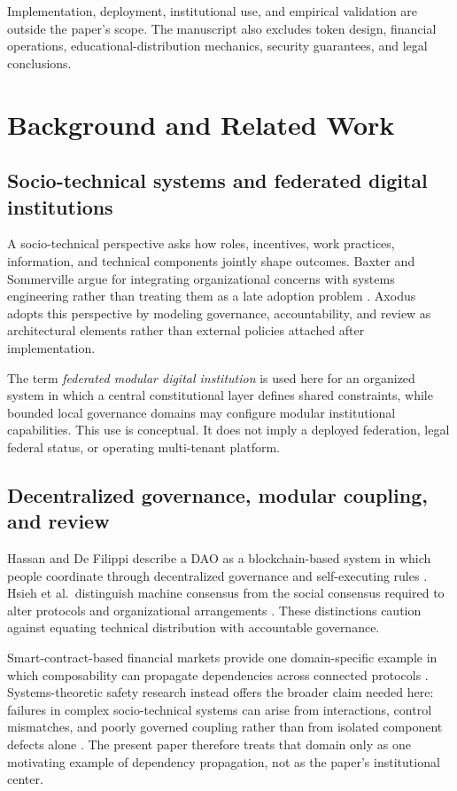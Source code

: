 \documentclass[11pt]{article}
\begin{document}
\begin{landscape}
Implementation, deployment, institutional use, and empirical validation are
outside the paper's scope. The manuscript also excludes token design,
financial operations, educational-distribution mechanics, security
guarantees, and legal conclusions.

\section{Background and Related Work}

\subsection{Socio-technical systems and federated digital institutions}

A socio-technical perspective asks how roles, incentives, work practices,
information, and technical components jointly shape outcomes. Baxter and
Sommerville argue for integrating organizational concerns with systems
engineering rather than treating them as a late adoption problem
\citep{baxter2011sociotechnical}. Axodus adopts this perspective by modeling
governance, accountability, and review as architectural elements rather than
external policies attached after implementation.

The term \emph{federated modular digital institution} is used here for an
organized system in which a central constitutional layer defines shared
constraints, while bounded local governance domains may configure modular
institutional capabilities. This use is conceptual. It does not imply a
deployed federation, legal federal status, or operating multi-tenant
platform.

\subsection{Decentralized governance, modular coupling, and review}

Hassan and De Filippi describe a DAO as a blockchain-based system in which
people coordinate through decentralized governance and self-executing rules
\citep{hassan2021dao}. Hsieh et al.\ distinguish machine consensus from the
social consensus required to alter protocols and organizational arrangements
\citep{hsieh2018bitcoin}. These distinctions caution against equating
technical distribution with accountable governance.

Smart-contract-based financial markets provide one domain-specific example in
which composability can propagate dependencies across connected protocols
\citep{schar2021defi}. Systems-theoretic safety research instead offers the
broader claim needed here: failures in complex socio-technical systems can
arise from interactions, control mismatches, and poorly governed coupling
rather than from isolated component defects alone
\citep{leveson2012engineering}. The present paper therefore treats that
domain only as one motivating example of dependency propagation, not as the
paper's institutional center.


\end{landscape}
\end{document}
